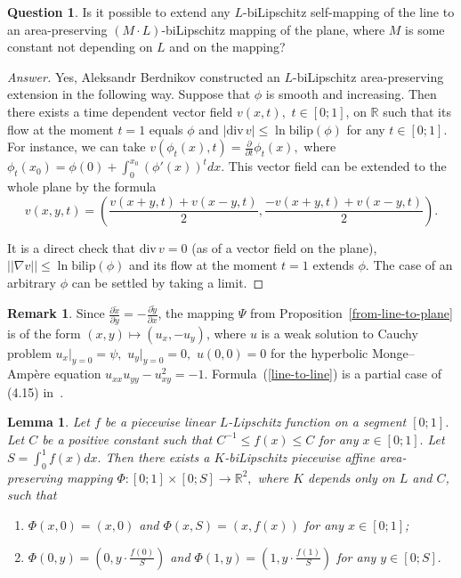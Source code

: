 \documentclass[12pt]{article}
\newtheorem{lemm}[prop]{Lemma}
\theoremstyle{definition}
\newtheorem{ques}[prop]{Question}
\newtheorem{rema}[prop]{Remark}
\begin{document}
\begin{ques}
Is it possible to extend any $L$-biLipschitz self-mapping of the line to an area-preserving $\left(M\cdot L\right)$-biLipschitz mapping of the plane, where $M$ is some constant not depending on $L$ and on the mapping?
\end{ques}
\begin{proof}[Answer]
Yes, Aleksandr Berdnikov constructed an $L$-biLipschitz area-preserving extension in the following way. Suppose that $\phi$ is smooth and increasing. Then there exists a time dependent vector field $v(x,t),$ $t\in[0;1]$, on $\mathbb R$ such that its flow at the moment $t=1$ equals $\phi$ and $|\mathrm{div}\, v|\le\ln\mathrm{bilip}(\phi)$ for any $t\in[0;1].$ For instance, we can take $v(\phi_t(x),t) = \frac{\partial}{\partial t}\phi_t (x),$ where $\phi_t(x_0) = \phi(0) + \int_0^{x_0} (\phi'(x))^t dx.$ This vector field can be extended to the whole plane by the formula
$$
v(x,y,t) = \left(\frac{v(x+y,t) + v(x-y,t)}2, \frac{-v(x+y,t) + v(x-y,t)}2 \right).
$$

It is a direct check that $\mathrm{div}\, v = 0$ (as of a vector field on the plane), $\left|\left|\nabla v\right|\right|\le\ln\mathrm{bilip}(\phi)$ and its flow at the moment $t=1$ extends $\phi.$ The case of an arbitrary $\phi$ can be settled by taking a limit.
\end{proof}

\begin{rema}
Since $\frac{\partial \widetilde x}{\partial y} = -\frac{\partial \widetilde y}{\partial x}$, the mapping $\Psi$ from Proposition~\ref{from-line-to-plane} is of the form $(x,y)\mapsto (u_x, -u_y)$, where $u$ is a weak solution to Cauchy problem $u_x\big|_{y=0} = \psi,$ $u_y\big|_{y=0} = 0,$ $u(0,0) = 0$ for the hyperbolic Monge--Amp\`ere equation $u_{xx} u_{yy} - u_{xy}^2 = -1.$ Formula~(\ref{line-to-line}) is a partial case of (4.15) in~\cite{Tun}.
\end{rema}

\begin{lemm}
\label{pl-square-to-graph0}
Let $f$ be a piecewise linear $L$-Lipschitz function on a segment $[0; 1]$. Let $C$ be a positive constant such that $C^{-1} \le f(x)\le C$ for any $x\in[0;1].$  Let $S = \int_0^1 f(x) dx.$ Then there exists a $K$-biLipschitz piecewise affine area-preserving mapping $\Phi: [0;1]\times [0;S] \to \mathbb R^2,$ where $K$ depends only on $L$ and $C$, such that
\begin{enumerate}[label = \arabic*),ref = \arabic*)]
\item
\label{top-bottom-sides-cond}
$\Phi(x, 0) = (x, 0)$ and $\Phi(x, S) = (x, f(x))$ for any $x\in[0;1]$;
\item
$\Phi(0, y) = \left(0, y\cdot\frac{f(0)}{S}\right)$ and $\Phi(1, y) = \left(1, y\cdot\frac{f(1)}{S}\right)$ for any $y\in[0;S].$
\end{enumerate}
\end{lemm}
\end{document}
